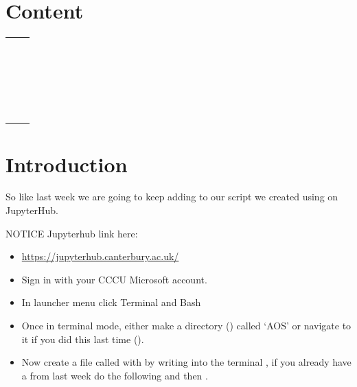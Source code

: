 \documentclass{article}
\author{Sebastian Blair}
\date{\today}
\begin{document}


\section*{Content}
\label{sec:content}

\begin{table}[H]
    \centering
    \begin{tabular}{c|c}
        \nameref{sec:intro}           & ~ \\ %
        \nameref{sec:globalVariables} & ~ \\
        \nameref{sec:errorChecking}   & ~ \\
        \nameref{sec:usageFunction}   & ~ \\
        \nameref{sec:theArguments}    & ~ \\
    \end{tabular}
\end{table}

\section*{Introduction}
\label{sec:intro}

So like last week we are going to keep adding to our  script we created using  on JupyterHub. 

\begin{shaded}
\textbf{\faInfo} \hspace{1em} NOTICE
Jupyterhub link here:
\begin{itemize}
    \item \url{https://jupyterhub.canterbury.ac.uk/}
    \item Sign in with your CCCU Microsoft account.
    \item In launcher menu click Terminal and Bash
    \item Once in terminal mode, either make a directory () called `AOS' or navigate to it if you did this last time (). 
    \item Now create a file called  with by writing into the terminal , if you already have a  from last week do the following  and then . 
\end{itemize}
\end{shaded}
\end{document}
